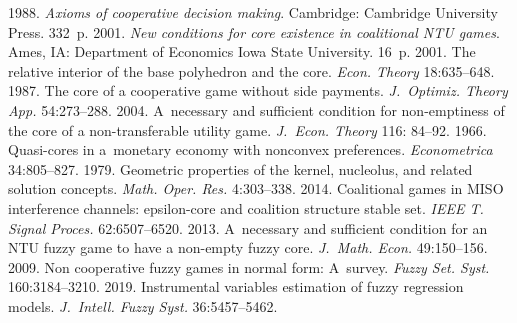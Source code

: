 



\vspace*{-4pt}

  \begin{multicols}{2}

\renewcommand{\bibname}{\protect\rmfamily References}

{\small\frenchspacing
 {\baselineskip=10.6pt
 \begin{thebibliography}{99}
 1988. \textit{Axioms of cooperative decision making}. Cambridge: Cambridge 
University Press. 332~p.
 2001. \textit{New conditions for core existence in coalitional NTU games}. Ames, 
IA: Department of Economics Iowa State University. 16~p.
 2001. The relative interior of the base polyhedron and the core. \textit{Econ. 
Theory} 18:635--648.
 1987. The core of a cooperative game without side 
payments.  \textit{J.~Optimiz. Theory App.} 54:273--288.
 2004. A~necessary and sufficient condition for 
non-emptiness of the core of a non-transferable utility game. \textit{J.~Econ. Theory} 116: 84--92.
 1966. Quasi-cores in a~monetary economy with nonconvex 
preferences. \textit{Econometrica} 34:805--827.
 1979. Geometric properties of the kernel, 
nucleolus, and related solution concepts. \textit{Math. Oper. Res.} 4:303--338.
 2014. Coalitional games in MISO interference channels: 
epsilon-core and coalition structure stable set. \textit{IEEE T. Signal Proces.}  
62:6507--6520.
 2013. A~necessary and sufficient condition for an NTU fuzzy game to 
have a non-empty fuzzy core. \textit{J.~Math. Econ.} 49:150--156.
       2009. Non cooperative fuzzy games in normal form: A~survey. 
\textit{Fuzzy Set. Syst.} 160:3184--3210.
 2019. Instrumental variables estimation of fuzzy regression models. 
\textit{J.~Intell. Fuzzy Syst.} 36:5457--5462.

 \end{thebibliography}

 }
 }

\end{multicols}

